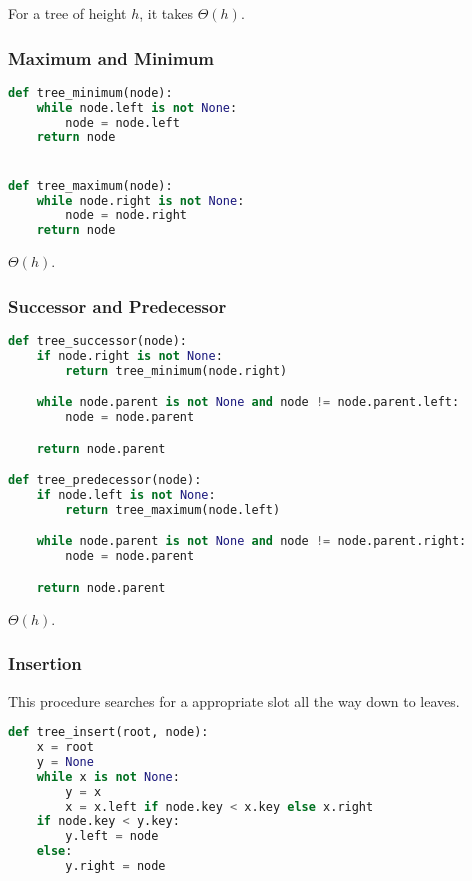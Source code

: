 \documentclass[11pt]{article}
\begin{document}
\begin{rtime*}
For a tree of height $h$, it takes $\Theta(h)$.
\end{rtime*}

\subsubsection{Maximum and Minimum}

\begin{lstlisting}[language=Python]
def tree_minimum(node):
    while node.left is not None:
        node = node.left
    return node


def tree_maximum(node):
    while node.right is not None:
        node = node.right
    return node
\end{lstlisting}

\begin{rtime*}
$\Theta(h)$.
\end{rtime*}

\subsubsection{Successor and Predecessor}

\begin{lstlisting}[language=Python]
def tree_successor(node):
    if node.right is not None:
        return tree_minimum(node.right)

    while node.parent is not None and node != node.parent.left:
        node = node.parent

    return node.parent

def tree_predecessor(node):
    if node.left is not None:
        return tree_maximum(node.left)

    while node.parent is not None and node != node.parent.right:
        node = node.parent

    return node.parent
\end{lstlisting}

\begin{rtime*}
$\Theta(h)$.
\end{rtime*}

\subsubsection{Insertion}

This procedure searches for a appropriate slot all the way down to leaves.

\begin{lstlisting}[language=Python]
def tree_insert(root, node):
    x = root
    y = None
    while x is not None:
        y = x
        x = x.left if node.key < x.key else x.right
    if node.key < y.key:
        y.left = node
    else:
        y.right = node
\end{lstlisting}
\end{document}
